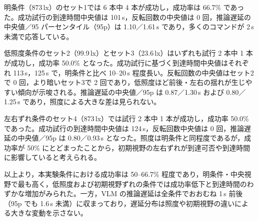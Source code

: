 \documentclass[a4paper,11pt]{ltjsreport}
\begin{document}
明条件（873\,lx）のセット1では 6 本中 4 本が成功し，成功率は 66.7\% であった。成功試行の到達時間中央値は 101\,s，反転回数の中央値は 0 回，推論遅延の中央値／95 パーセンタイル（95p）は 1.10／1.61\,s であり，多くのコマンドが 2\,s 未満で応答している。

低照度条件のセット2（99.9\,lx）とセット3（23.6\,lx）はいずれも試行 2 本中 1 本が成功し，成功率 50.0\% となった。成功試行に基づく到達時間中央値はそれぞれ 113\,s，125\,s で，明条件と比べ 10--20\,s 程度長い。反転回数の中央値はセット2で 0 回，より暗いセット3で 2 回であり，低照度ほど前後・左右の揺れが生じやすい傾向が示唆される。推論遅延の中央値／95p は 0.87／1.30\,s および 0.80／1.25\,s であり，照度による大きな差は見られない。

左右ずれ条件のセット4（873\,lx）では試行 2 本中 1 本が成功し，成功率 50.0\% であった。成功試行の到達時間中央値は 124\,s，反転回数中央値は 0 回，推論遅延の中央値／95p は 0.80／0.93\,s となった。照度は明条件と同程度であるが，成功率が 50\% にとどまったことから，初期視野の左右ずれが到達可否や到達時間に影響していると考えられる。

以上より，本実験条件における成功率は 50--66.7\% 程度であり，明条件・中央視野で最も高く，低照度および初期視野ずれの条件では成功率低下と到達時間のわずかな増加がみられた。一方，VLM の推論遅延は全条件でおおむね 1\,s 前後（95p でも 1.6\,s 未満）に収まっており，遅延分布は照度や初期視野の違いによる大きな変動を示さない。
\end{document}

